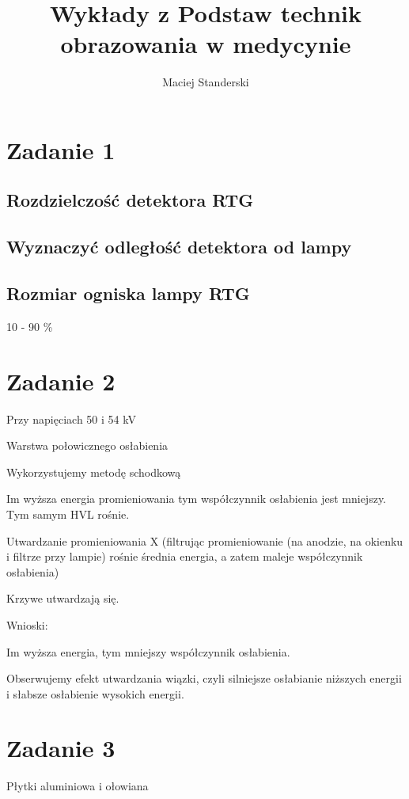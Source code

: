 \documentclass{article}
\title{Wykłady z Podstaw technik obrazowania w medycynie}
\author{Maciej Standerski}
\begin{document}
\maketitle

\section{Zadanie 1}

\subsection{Rozdzielczość detektora RTG}

\subsection{Wyznaczyć odległość detektora od lampy}

\subsection{Rozmiar ogniska lampy RTG}
10 - 90 \%

\section{Zadanie 2}

Przy napięciach 50 i 54 kV

Warstwa połowicznego osłabienia

Wykorzystujemy metodę schodkową

Im wyższa energia promieniowania tym współczynnik osłabienia jest mniejszy. Tym samym HVL rośnie.

Utwardzanie promieniowania X (filtrując promieniowanie (na anodzie, na okienku i filtrze przy lampie) rośnie średnia energia, a zatem maleje współczynnik osłabienia)

Krzywe utwardzają się.

Wnioski:

Im wyższa energia, tym mniejszy współczynnik osłabienia.

Obserwujemy efekt utwardzania wiązki, czyli silniejsze osłabianie niższych energii i słabsze osłabienie wysokich energii.

\section{Zadanie 3}

Płytki aluminiowa i ołowiana
\end{document}
